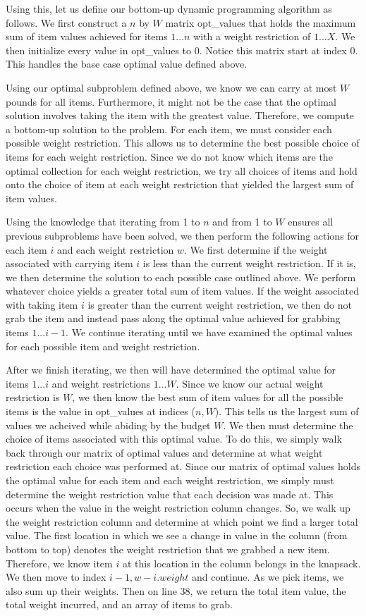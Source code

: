 \documentclass[11pt]{article}
\begin{document}
Using this, let us define our bottom-up dynamic programming algorithm as follows. We first construct a $n$ by $W$ matrix opt\_values that holds the maximum sum of item values achieved for items $1...n$ with a weight restriction of $1...X$. We then initialize every value in opt\_values to 0. Notice this matrix start at index 0. This handles the base case optimal value defined above.

Using our optimal subproblem defined above, we know we can carry at most $W$ pounds for all items. Furthermore, it might not be the case that the optimal solution involves taking the item with the greatest value. Therefore, we compute a bottom-up solution to the problem. For each item, we must consider each possible weight restriction. This allows us to determine the best possible choice of items for each weight restriction. Since we do not know which items are the optimal collection for each weight restriction, we try all choices of items and hold onto the choice of item at each weight restriction that yielded the largest sum of item values.

Using the knowledge that iterating from 1 to $n$ and from 1 to $W$ ensures all previous subproblems have been solved, we then perform the following actions for each item $i$ and each weight restriction $w$. We first determine if the weight associated with carrying item $i$ is less than the current weight restriction. If it is, we then determine the solution to each possible case outlined above. We perform whatever choice yields a greater total sum of item values. If the weight associated with taking item $i$ is greater than the current weight restriction, we then do not grab the item and instead pass along the optimal value achieved for grabbing items $1...i-1$. We continue iterating until we have examined the optimal values for each possible item and weight restriction.

After we finish iterating, we then will have determined the optimal value for items $1...i$ and weight restrictions $1...W$. Since we know our actual weight restriction is $W$, we then know the best sum of item values for all the possible items is the value in opt\_values at indices ($n,W$). This tells us the largest sum of values we acheived while abiding by the budget $W$. We then must determine the choice of items associated with this optimal value. To do this, we simply walk back through our matrix of optimal values and determine at what weight restriction each choice was performed at. Since our matrix of optimal values holds the optimal value for each item and each weight restriction, we simply must determine the weight restriction value that each decision was made at. This occurs when the value in the weight restriction column changes. So, we walk up the weight restriction column and determine at which point we find a larger total value. The first location in which we see a change in value in the column (from bottom to top) denotes the weight restriction that we grabbed a new item. Therefore, we know item $i$ at this location in the column belongs in the knapsack. We then move to index $i - 1, w - i.weight$ and continue. As we pick items, we also sum up their weights. Then on line 38, we return the total item value, the total weight incurred, and an array of items to grab.
\end{document}
